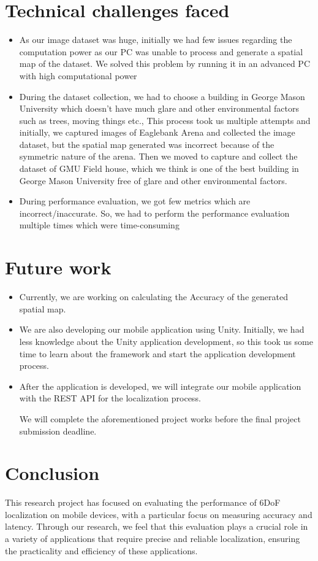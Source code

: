\documentclass[sigconf]{acmart}
\begin{document}
\section{Technical challenges faced}
\begin{itemize}
    \item{As our image dataset was huge, initially we had few issues regarding the computation power as our PC was unable to process and generate a spatial map of the dataset. We solved this problem by running it in an advanced PC with high computational power}
    \item{During the dataset collection, we had to choose a building in George Mason University which doesn't have much glare and other environmental factors such as trees, moving things etc., This process took us multiple attempts and initially, we captured images of Eaglebank Arena and collected the image dataset, but the spatial map generated was incorrect because of the symmetric nature of the arena. Then we moved to capture and collect the dataset of GMU Field house, which we think is one of the best building in George Mason University free of glare and other environmental factors.}
    \item{During performance evaluation, we got few metrics which are incorrect/inaccurate. So, we had to perform the performance evaluation multiple times which were time-consuming}
\end{itemize}

\section{Future work}
\begin{itemize}
    \item{Currently, we are working on calculating the Accuracy of the generated spatial map.}
    \item{We are also developing our mobile application using Unity. Initially, we had less knowledge about the Unity application development, so this took us some time to learn about the framework and start the application development process.}
    \item{After the application is developed, we will integrate our mobile application with the REST API for the localization process.}

We will complete the aforementioned project works before the final project submission deadline.
\end{itemize}

\section{Conclusion}
This research project has focused on evaluating the performance of 6DoF localization on mobile devices, with a particular focus on measuring accuracy and latency. Through our research, we feel that this evaluation plays a crucial role in a variety of applications that require precise and reliable localization, ensuring the practicality and efficiency of these applications.
\end{document}
